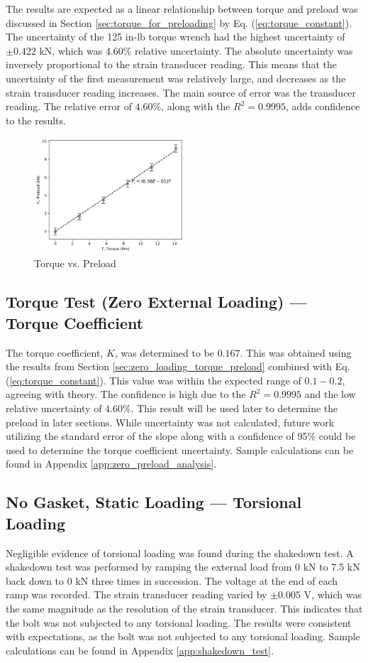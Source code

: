 The results are expected as a linear relationship between torque and preload was discussed in Section \ref{sec:torque_for_preloading} by Eq. (\ref{eq:torque_constant}). The uncertainty of the 125 in-lb torque wrench had the highest uncertainty of $\pm 0.422$ kN, which was $4.60\%$ relative uncertainty. The absolute uncertainty was inversely proportional to the strain transducer reading. This means that the uncertainty of the first measurement was relatively large, and decreases as the strain transducer reading increases. The main source of error was the transducer reading. The relative error of $4.60\%$, along with the $R^2 = 0.9995$, adds confidence to the results. 
\begin{figure}[h]
    \centering
    \includegraphics[width=0.5\textwidth]{Sections/Figures/torque_vs_preload.png}
    \caption{Torque vs. Preload}
    \label{fig:torque_vs_preload}
\end{figure}

\subsection{Torque Test (Zero External Loading) --- Torque Coefficient}
The torque coefficient, $K$, was determined to be $0.167$. This was obtained using the results from Section \ref{sec:zero_loading_torque_preload} combined with Eq. (\ref{eq:torque_constant}). This value was within the expected range of $0.1 - 0.2$, agreeing with theory. The confidence is high due to the $R^2 = 0.9995$ and the low relative uncertainty of $4.60\%$. This result will be used later to determine the preload in later sections. While uncertainty was not calculated, future work utilizing the standard error of the slope along with a confidence of 95\% could be used to determine the torque coefficient uncertainty. Sample calculations can be found in Appendix \ref{app:zero_preload_analysis}.

\subsection{No Gasket, Static Loading --- Torsional Loading}
Negligible evidence of torsional loading was found during the shakedown test. A shakedown test was performed by ramping the external load from 0 kN to 7.5 kN back down to 0 kN three times in succession. The voltage at the end of each ramp was recorded. The strain transducer reading varied by $\pm 0.005$ V, which was the same magnitude as the resolution of the strain transducer. This indicates that the bolt was not subjected to any torsional loading. The results were consistent with expectations, as the bolt was not subjected to any torsional loading. Sample calculations can be found in Appendix \ref{app:shakedown_test}.

